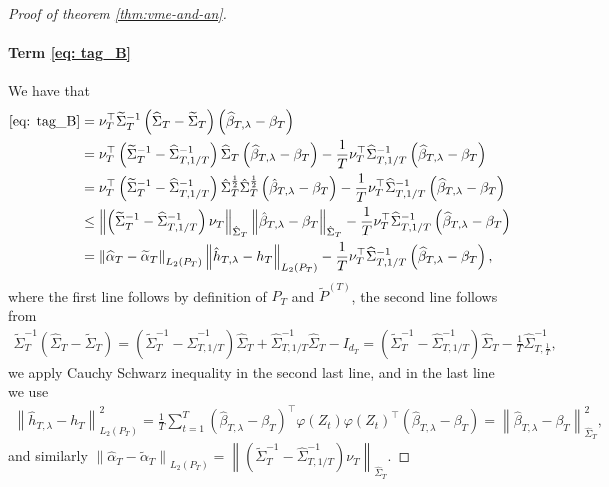 \documentclass[11pt]{article}
\begin{document}
\begin{proof}[Proof of theorem \ref{thm:vme-and-an}]
\paragraph{Term \eqref{eq: tag_B}} We have that
\begin{align*}
    \eqref{eq: tag_B} &= \nu_T^{\top} \widetilde \Sigma_T^{-1} \left(\widehat \Sigma_T - \widetilde \Sigma_T\right) \left(\widehat \beta_{T,\lambda} - \beta_T\right) \\
    &= \nu_T^{\top} \left(\widetilde \Sigma_T^{-1} - \widehat \Sigma_{T,1/T}^{-1}\right) \widehat \Sigma_T \left(\widehat \beta_{T,\lambda} - \beta_T\right) - \frac{1}{T} \nu_T^{\top} \widehat \Sigma_{T,1/T}^{-1} \left(\widehat \beta_{T,\lambda} - \beta_T\right) \\
    &= \nu_T^{\top} \left(\widetilde \Sigma_T^{-1} - \widehat \Sigma_{T,1/T}^{-1}\right)\hat{\Sigma}_T^{\frac{1}{2}}\hat{\Sigma}_T^{\frac{1}{2}}\left(\hat{\beta}_{T,\lambda} - \beta_T\right) - \frac{1}{T} \nu_T^{\top} \widehat \Sigma_{T,1/T}^{-1} \left(\widehat \beta_{T,\lambda} - \beta_T\right)\\
    &\leq \left\|\left(\widetilde\Sigma_T^{-1} - \widehat \Sigma_{T,1/T}^{-1}\right)\nu_T\right\|_{\hat{\Sigma}_T}\left\|\hat{\beta}_{T,\lambda} - \beta_T\right\|_{\hat{\Sigma}_T} - \frac{1}{T} \nu_T^{\top} \widehat \Sigma_{T,1/T}^{-1} \left(\widehat \beta_{T,\lambda} - \beta_T\right)\\
    &= \left\|\widehat \alpha_T - \widetilde \alpha_T\right\|_{L_2(P_T)} \left\|\hat{h}_{T,\lambda} - h_T\right\|_{L_2(P_T)} - \frac{1}{T} \nu_T^{\top} \widehat \Sigma_{T,1/T}^{-1} \left(\widehat \beta_{T,\lambda} - \beta_T\right),
\end{align*}
where the first line follows by definition of $P_T$ and $\widetilde P^{(T)}$, the second line follows from
\begin{align*}
    \widetilde \Sigma_T^{-1}\left(\hat{\Sigma}_T - \widetilde \Sigma_T\right) = \left(\widetilde \Sigma_T^{-1} - \hat{\Sigma}_{T,1/T}^{-1}\right)\hat{\Sigma}_T + \hat{\Sigma}_{T,1/T}^{-1}\hat{\Sigma}_T - I_{d_T} = \left(\widetilde \Sigma_T^{-1} - \hat{\Sigma}_{T,1/T}^{-1}\right)\hat{\Sigma}_T - \frac{1}{T}\hat{\Sigma}_{T,\frac{1}{T}}^{-1},
\end{align*}
we apply Cauchy Schwarz inequality in the second last line,   and in the last line we use
\begin{align*}
    \left\|\hat{h}_{T,\lambda} - h_T\right\|_{L_2(P_T)}^2 = \frac{1}{T}\sum_{t=1}^{T} \left(\hat{\beta}_{T,\lambda} - \beta_T\right)^{\top} \varphi(Z_t)\varphi(Z_t)^{\top}\left(\hat{\beta}_{T,\lambda} - \beta_T\right) = \left\|\hat{\beta}_{T,\lambda} - \beta_T\right\|_{\hat{\Sigma}_T}^2,
\end{align*}
and similarly $\left\|\widehat \alpha_T - \widetilde \alpha_T\right\|_{L_2(P_T)} = \left\|\left(\widetilde \Sigma_T^{-1} - \widehat \Sigma_{T,1/T}^{-1}\right)\nu_T\right\|_{\hat{\Sigma}_T}$. 



\end{proof}
\end{document}
